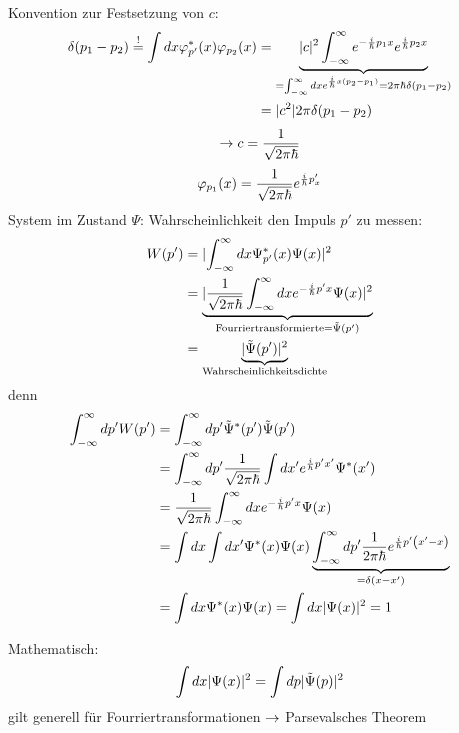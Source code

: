 Konvention zur Festsetzung von $c$:
\begin{align*}
    \delta(p_1 - p_2) \overset{!}{=} \int dx \varphi_{p'}^*(x) \varphi_{p_2}(x)
    &=
    \underbrace{\lvert c \rvert^2 \int_{-\infty}^{\infty} e^{- \frac{i}{\hbar} p_1 x}
    e^{\frac{i}{\hbar}  p_2 x}}_{=\int_{-\infty}^{\infty} dx e^{\frac{i}{\hbar} x \left(
    p_2 - p_1 \right)} = 2 \pi \hbar \delta (p_1 - p_2)} \\
    &=
    \lvert c^2 \rvert 2 \pi \delta(p_1 - p_2) 
\end{align*}
\begin{equation*}
    \rightarrow c= \frac{1}{\sqrt{2\pi\hbar}}
\end{equation*}
\begin{equation*}
    \varphi_{p_1}(x) = \frac{1}{\sqrt{2 \pi \hbar}} e^{\frac{i}{\hbar} p'_x}
\end{equation*}
System im Zustand $\Psi$: Wahrscheinlichkeit den Impuls $p'$ zu messen:
\begin{align*}
    W(p')
    &=
    \lvert \int_{-\infty}^{\infty} dx \Psi_{p'}^*(x) \Psi(x) \rvert^2 \\
    &=
    \underbrace{\lvert \frac{1}{\sqrt{2\pi\hbar}} 
    \int_{-\infty}^{\infty} dx e^{-\frac{i}{\hbar}p'x}\Psi(x)
    \rvert^2}_{\text{Fourriertransformierte} = \tilde{\Psi}(p')} \\
    &=
    \underbrace{\lvert \tilde{\Psi}(p')\rvert^2}_{\text{Wahrscheinlichkeitsdichte}}
\end{align*}
denn
\begin{align*}
    \int_{-\infty}^{\infty} dp' W(p')
    &=
    \int_{-\infty}^{\infty} dp' \tilde{\Psi}^*(p') \tilde{\Psi}(p') \\
    &=
    \int_{-\infty}^{\infty} dp' \frac{1}{\sqrt{2 \pi \hbar}}
    \int dx' e^{\frac{i}{\hbar} p' x'} \Psi^*(x') \\
    &=
    \frac{1}{\sqrt{2 \pi \hbar}} \int_{-\infty}^{\infty} dx e^{- \frac{i}{\hbar}p'
    x} \Psi(x)\\
    &=
    \int dx \int dx' \Psi^*(x)\Psi(x)
    \underbrace{\int_{-\infty}^{\infty} dp' \frac{1}{2 \pi \hbar}
    e^{\frac{i}{\hbar} p' \left( x' - x \right) }}_{=\delta(x-x')}\\
    &=
    \int dx \Psi^*(x)\Psi(x) = \int dx \lvert \Psi(x) \rvert^2 = 1
\end{align*}
\begin{eins}{Mathematisch:}
     \begin{equation*}
         \int dx \lvert \Psi(x) \rvert^2 = \int dp \lvert \tilde{\Psi}(p) \rvert^2
     \end{equation*}
     gilt generell für Fourriertransformationen $\rightarrow$ Parsevalsches Theorem
\end{eins}
